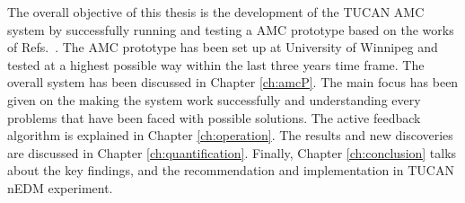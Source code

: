 The overall objective of this thesis is the development of the TUCAN AMC system by successfully running and testing a AMC prototype based on the works of Refs.~\cite{bea,lins}. The AMC prototype has been set up at University of Winnipeg and tested at a highest possible way within the last three years time frame. The overall system has been discussed in Chapter \ref{ch:amcP}. The main focus has been given on the making the system work successfully and understanding every problems that have been faced with possible solutions. The active feedback algorithm is explained in Chapter \ref{ch:operation}. The results and new discoveries are discussed in Chapter \ref{ch:quantification}. Finally, Chapter \ref{ch:conclusion} talks about the key findings, and the recommendation and implementation in TUCAN nEDM experiment. 








